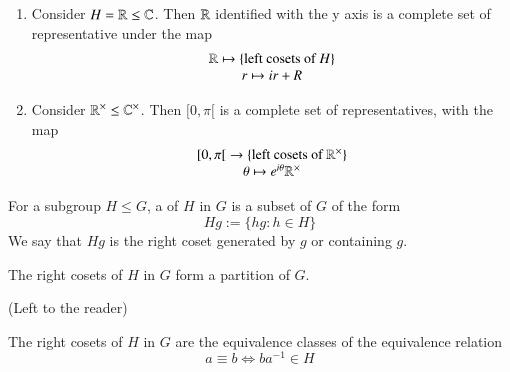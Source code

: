 \documentclass[12pt, a4paper, twoside, openright, titlepage]{book}
\begin{document}
\begin{eg}{}{}
\begin{enumerate}
\begin{center}
\begin{tikzpicture}[x=0.75pt,y=0.75pt,yscale=-1,xscale=1]
							\end{tikzpicture}
						\end{center}
				A complete set of representatives is $\R_{>0}$. Indeed, the map \begin{equation}
					\map{\R_{>0}\xrightarrow{f}\{\text{left cosets of $H$ in $\C^{\times}$}\}}{r\mapsto rH}
				\end{equation}
				Indeed, for all $x \in \C^{\times}$ $x = re^{i\theta}$ so $xH = re^{i\theta}H = rH$, as $e^{i\theta} \in H$, so $f$ is surjective. If $r,r' \in rH$ then $r' = rz$ with $|z| = 1$, so $|r'| = |rz| = |r|$. But, for $r,r' \in \R_{>0}$ $|r'| = |r|$ implies $r' = r$. Thus, $f$ is a bijection.
			\item Consider $H = \R\leq \C$. Then $\R$ identified with the y axis is a complete set of representative under the map \begin{equation}
				\map{\R\mapsto\{\text{left cosets of $H$}\}}{r\mapsto ir+R}
			\end{equation}
			\item Consider $\R^{\times} \leq \C^{\times}$. Then $[0,\pi[$ is a complete set of representatives, with the map \begin{equation}
				\map{{[0,\pi[}\rightarrow\{\text{left cosets of $\R^{\times}$}\}}{\theta \mapsto e^{i\theta}\R^{\times}}
			\end{equation}
		\end{enumerate}
\end{eg}

\begin{defn}{}{}
        For a subgroup $H \leq G$, a  of $H$ in $G$ is a subset of $G$ of the form \begin{equation}
                Hg := \{hg:h\in H\}
        \end{equation}
        We say that $Hg$ is the right coset generated by $g$ or containing $g$.
\end{defn}

\begin{thm}{}{}
        The right cosets of $H$ in $G$ form a partition of $G$.
\end{thm}
\begin{proof*}{}{}
        (Left to the reader)
\end{proof*}


\begin{rmk}{}{}
        The right cosets of $H$ in $G$ are the equivalence classes of the equivalence relation \begin{equation}
                a\equiv b \iff ba^{-1} \in H
        \end{equation}
\end{rmk}
\end{document}
